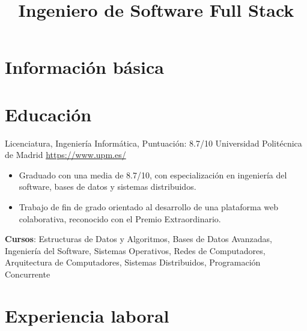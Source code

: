 \documentclass[a4paper, serif, 10pt]{moderncv}
\title{Ingeniero de Software Full Stack}
\begin{document}
\maketitle

\section{Información básica}

\section{Educación}

        {Licenciatura, Ingeniería Informática, Puntuación: 8.7/10}
        {Universidad Politécnica de Madrid}
        {\url{https://www.upm.es/}}
        {}
        {\begin{itemize}
\item Graduado con una media de 8.7/10, con especialización en ingeniería del software, bases de datos y sistemas distribuidos.
\item Trabajo de fin de grado orientado al desarrollo de una plataforma web colaborativa, reconocido con el Premio Extraordinario.
\end{itemize}
\textbf{Cursos}: Estructuras de Datos y Algoritmos, Bases de Datos Avanzadas, Ingeniería del Software, Sistemas Operativos, Redes de Computadores, Arquitectura de Computadores, Sistemas Distribuidos, Programación Concurrente}
\section{Experiencia laboral}
\end{document}
